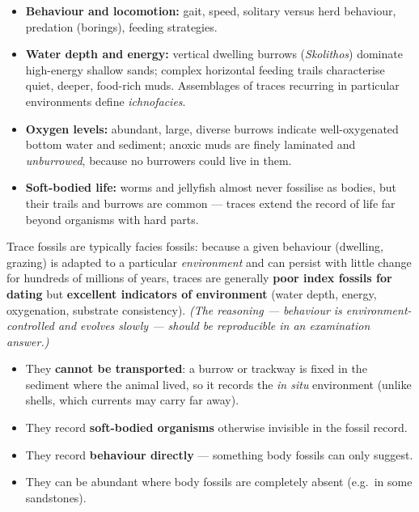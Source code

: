 \documentclass[11pt]{article}
\newcommand{\cle}[1]{{\popxbold\color{popdark}#1}}
\begin{document}
\begin{itemize}
  \item \textbf{Behaviour and locomotion:} gait, speed, solitary versus herd behaviour, predation (borings), feeding strategies.
  \item \textbf{Water depth and energy:} vertical dwelling burrows (\emph{Skolithos}) dominate high-energy shallow sands; complex horizontal feeding trails characterise quiet, deeper, food-rich muds. Assemblages of traces recurring in particular environments define \emph{ichnofacies}.
  \item \textbf{Oxygen levels:} abundant, large, diverse burrows indicate well-oxygenated bottom water and sediment; anoxic muds are finely laminated and \emph{unburrowed}, because no burrowers could live in them.
  \item \textbf{Soft-bodied life:} worms and jellyfish almost never fossilise as bodies, but their trails and burrows are common --- traces extend the record of life far beyond organisms with hard parts.
\end{itemize}

\begin{propriete}
Trace fossils are typically \cle{facies fossils}: because a given behaviour (dwelling, grazing) is adapted to a particular \emph{environment} and can persist with little change for hundreds of millions of years, traces are generally \textbf{poor index fossils for dating} but \textbf{excellent indicators of environment} (water depth, energy, oxygenation, substrate consistency). \emph{(The reasoning --- behaviour is environment-controlled and evolves slowly --- should be reproducible in an examination answer.)}
\end{propriete}

\begin{aretenir}
\begin{itemize}
  \item They \textbf{cannot be transported}: a burrow or trackway is fixed in the sediment where the animal lived, so it records the \emph{in situ} environment (unlike shells, which currents may carry far away).
  \item They record \textbf{soft-bodied organisms} otherwise invisible in the fossil record.
  \item They record \textbf{behaviour directly} --- something body fossils can only suggest.
  \item They can be abundant where body fossils are completely absent (e.g.\ in some sandstones).
\end{itemize}
\end{aretenir}
\end{document}
